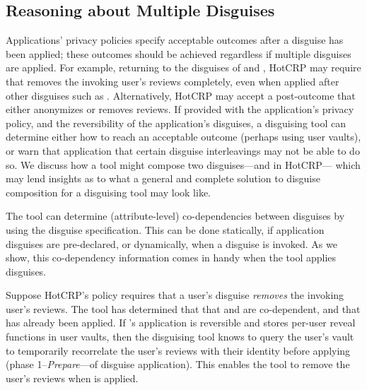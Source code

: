 \subsection{Reasoning about Multiple Disguises}
\label{sec:composition}
Applications' privacy policies specify acceptable outcomes after a disguise has been applied; these
outcomes should be achieved regardless if multiple disguises are applied.  For example, returning to
the disguises of \gdpr and \ca, HotCRP may require that \gdpr removes the invoking user's reviews
completely, even when applied after other disguises such as \ca.  Alternatively, HotCRP may accept a
post-\gdpr outcome that either anonymizes or removes reviews. If provided with the application's
privacy policy, and the reversibility of the application's disguises, a disguising tool can
determine either how to reach an acceptable outcome (perhaps using user vaults), or warn that
application that certain disguise interleavings may not be able to do so.
We discuss how a tool might compose two disguises---\gdpr and \ca in HotCRP---
which may lend insights as to what a general and complete solution to disguise composition for a disguising tool may look like.

The tool can determine (attribute-level) co-dependencies between disguises by using the disguise
specification. This can be done statically, if application disguises are pre-declared, or
dynamically, when a disguise is invoked.  As we show, this co-dependency information comes in handy
when the tool applies disguises.

Suppose HotCRP's policy requires that a user's \gdpr disguise \emph{removes} the invoking user's
reviews.  The tool has determined that that \gdpr and \ca are co-dependent, and that \ca has already
been applied.
%
If \ca's application is reversible and stores per-user reveal functions in user vaults, then the
disguising tool knows to query the user's vault to temporarily recorrelate the user's reviews with
their identity before applying \gdpr (phase 1--\emph{Prepare}---of disguise application). This
enables the tool to remove the user's reviews when \gdpr is applied.
%

